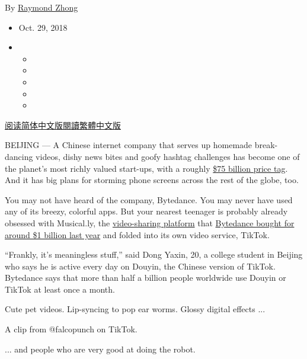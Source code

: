 By \href{https://www.nytimes3xbfgragh.onion/by/raymond-zhong}{Raymond
Zhong}

\begin{itemize}
\item
  Oct. 29, 2018
\item
  \begin{itemize}
  \item
  \item
  \item
  \item
  \item
  \end{itemize}
\end{itemize}

\href{https://cn.nytimes3xbfgragh.onion/technology/20181030/bytedance-app-funding-china/}{阅读简体中文版}\href{https://cn.nytimes3xbfgragh.onion/technology/20181030/bytedance-app-funding-china/zh-hant/}{閱讀繁體中文版}

BEIJING --- A Chinese internet company that serves up homemade
break-dancing videos, dishy news bites and goofy hashtag challenges has
become one of the planet's most richly valued start-ups, with a roughly
\href{https://www.nytimes3xbfgragh.onion/2018/09/28/technology/bytedance-fundraising-toutiao-tiktok.html}{\$75
billion price tag}. And it has big plans for storming phone screens
across the rest of the globe, too.

You may not have heard of the company, Bytedance. You may never have
used any of its breezy, colorful apps. But your nearest teenager is
probably already obsessed with Musical.ly, the
\href{https://www.nytimes3xbfgragh.onion/2016/08/10/technology/china-homegrown-internet-companies-rest-of-the-world.html}{video-sharing
platform} that
\href{https://www.nytimes3xbfgragh.onion/2017/11/10/business/dealbook/musically-sold-app-video.html}{Bytedance
bought for around \$1 billion last year} and folded into its own video
service, TikTok.

``Frankly, it's meaningless stuff,'' said Dong Yaxin, 20, a college
student in Beijing who says he is active every day on Douyin, the
Chinese version of TikTok. Bytedance says that more than half a billion
people worldwide use Douyin or TikTok at least once a month.

Cute pet videos. Lip-syncing to pop ear worms. Glossy digital effects
...

A clip from @falcopunch on TikTok.

... and people who are very good at doing the robot.

